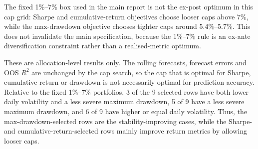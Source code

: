 ﻿\documentclass[10pt,a4paper]{article}
\begin{document}
\begin{table}[H]\centering\scriptsize
{}
\caption{Best maximum-weight cap by kernel and portfolio-level objective. The lower bound remains 1\%; only the upper cap is selected on the grid.}
\end{table}

The fixed 1\%--7\% box used in the main report is not the ex-post optimum in this cap grid: Sharpe and cumulative-return objectives choose looser caps above 7\%, while the max-drawdown objective chooses tighter caps around 5.4\%--5.7\%. This does not invalidate the main specification, because the 1\%--7\% rule is an ex-ante diversification constraint rather than a realised-metric optimum.

These are allocation-level results only. The rolling forecasts, forecast errors and OOS \(R^2\) are unchanged by the cap search, so the cap that is optimal for Sharpe, cumulative return or drawdown is not necessarily optimal for prediction accuracy. Relative to the fixed 1\%--7\% portfolios, 3 of the 9 selected rows have both lower daily volatility and a less severe maximum drawdown, 5 of 9 have a less severe maximum drawdown, and 6 of 9 have higher or equal daily volatility. Thus, the max-drawdown-selected rows are the stability-improving cases, while the Sharpe- and cumulative-return-selected rows mainly improve return metrics by allowing looser caps.
\end{document}
